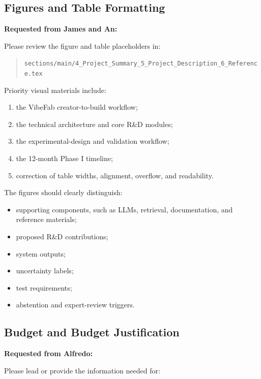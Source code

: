 \documentclass[11pt,letterpaper]{article}
\begin{document}
\subsection{Figures and Table Formatting}

\textbf{Requested from James and An:}

Please review the figure and table placeholders in:

\begin{quote}
\texttt{sections/main/4\_Project\_Summary\_5\_Project\_Description\_6\_Reference.tex}
\end{quote}

Priority visual materials include:

\begin{enumerate}[leftmargin=0.3in]
    \item the VibeFab creator-to-build workflow;
    \item the technical architecture and core R\&D modules;
    \item the experimental-design and validation workflow;
    \item the 12-month Phase I timeline;
    \item correction of table widths, alignment, overflow, and readability.
\end{enumerate}

The figures should clearly distinguish:

\begin{itemize}[leftmargin=0.25in]
    \item supporting components, such as LLMs, retrieval, documentation, and
    reference materials;
    \item proposed R\&D contributions;
    \item system outputs;
    \item uncertainty labels;
    \item test requirements;
    \item abstention and expert-review triggers.
\end{itemize}

\subsection{Budget and Budget Justification}

\textbf{Requested from Alfredo:}

Please lead or provide the information needed for:
\end{document}
